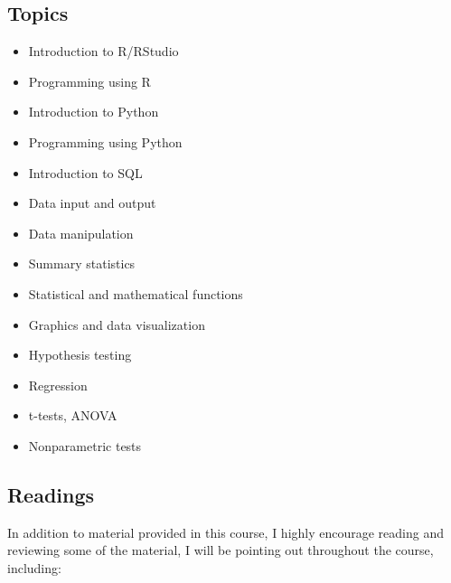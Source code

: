 \documentclass[
  letterpaper,
  DIV=11,
  numbers=noendperiod]{scrreprt}
\providecommand{\tightlist}{%
  \setlength{\itemsep}{0pt}\setlength{\parskip}{0pt}}\usepackage{longtable,booktabs,array}
\begin{document}
\hypertarget{topics}{%
\subsection*{Topics}\label{topics}}

\begin{itemize}
\tightlist
\item
  Introduction to R/RStudio
\item
  Programming using R
\item
  Introduction to Python
\item
  Programming using Python
\item
  Introduction to SQL
\item
  Data input and output
\item
  Data manipulation
\item
  Summary statistics
\item
  Statistical and mathematical functions
\item
  Graphics and data visualization
\item
  Hypothesis testing
\item
  Regression
\item
  t-tests, ANOVA
\item
  Nonparametric tests
\end{itemize}

\hypertarget{readings}{%
\subsection*{Readings}\label{readings}}

In addition to material provided in this course, I highly encourage
reading and reviewing some of the material, I will be pointing out
throughout the course, including:
\end{document}
